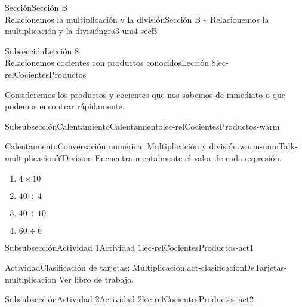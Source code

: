\begin{sectionptx}{Sección}{{\Large Sección B\\}Relacionemos la multiplicación y la división}{}{Sección B -~Relacionemos la multiplicación y la división}{}{}{gra3-uni4-secB}
\begin{subsectionptx}{Subsección}{{\normalsize Lección 8\\[-0.05cm]}Relacionemos cocientes con productos conocidos}{}{Lección 8}{}{}{lec-relCocientesProductos}
\begin{introduction}{}%
Consideremos los productos y cocientes que nos sabemos de inmediato o que podemos encontrar rápidamente.%
\end{introduction}%
%
%
\typeout{************************************************}
\typeout{************************************************}
%
\begin{subsubsectionptx}{Subsubsección}{Calentamiento}{}{Calentamiento}{}{}{lec-relCocientesProductos-warm}
\begin{exploration}{Calentamiento}{Conversación numérica: Multiplicación y división.}{warm-numTalk-multiplicacionYDivision}%
Encuentra mentalmente el valor de cada expresión.%
%
\begin{enumerate}[label={\Alph*.}]
\item{}\(\displaystyle 4\times 10\)%
\item{}\(\displaystyle 40\div 4\)%
\item{}\(\displaystyle 40\div 10\)%
\item{}\(\displaystyle 60\div 6\)%
\end{enumerate}
\end{exploration}%
\end{subsubsectionptx}
%
%
\typeout{************************************************}
\typeout{************************************************}
%
\begin{subsubsectionptx}{Subsubsección}{Actividad 1}{}{Actividad 1}{}{}{lec-relCocientesProductos-act1}
\begin{activity}{Actividad}{Clasificación de tarjetas: Multiplicación.}{act-clasificacionDeTarjetas-multiplicacion}%
Ver libro de trabajo.
\end{activity}%
\end{subsubsectionptx}
%
%
\typeout{************************************************}
\typeout{************************************************}
%
\begin{subsubsectionptx}{Subsubsección}{Actividad 2}{}{Actividad 2}{}{}{lec-relCocientesProductos-act2}

\end{subsubsectionptx}
\end{subsectionptx}
\end{sectionptx}
